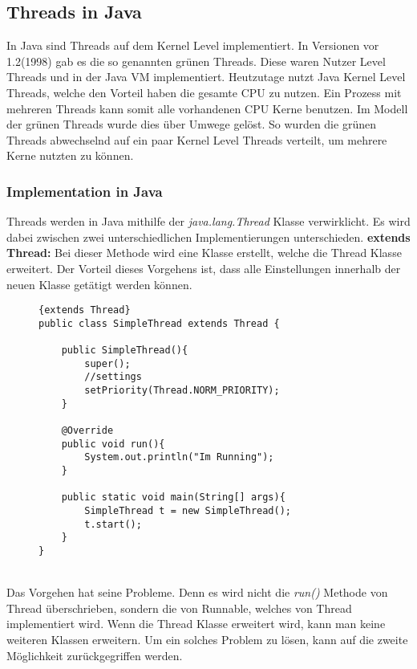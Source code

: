 \subsection{Threads in Java}
In Java sind Threads auf dem Kernel Level implementiert. In Versionen vor 1.2(1998) gab es die so genannten grünen Threads. Diese waren Nutzer Level Threads und in der Java VM implementiert. Heutzutage nutzt Java Kernel Level Threads, welche den Vorteil haben die gesamte CPU zu nutzen. Ein Prozess mit mehreren Threads kann somit alle vorhandenen CPU Kerne benutzen. Im Modell der grünen Threads wurde dies über Umwege gelöst. So wurden die grünen Threads abwechselnd auf ein paar Kernel Level Threads verteilt, um mehrere Kerne nutzten zu können.\cite{Threads:Cox}
\subsubsection{Implementation in Java}
Threads werden in Java mithilfe der \textit{java.lang.Thread} Klasse verwirklicht. Es wird dabei zwischen zwei unterschiedlichen Implementierungen unterschieden.
\smallskip
\newline
\textbf{extends Thread:} Bei dieser Methode wird eine Klasse erstellt, welche die Thread Klasse erweitert. Der Vorteil dieses Vorgehens ist, dass alle Einstellungen innerhalb der neuen Klasse getätigt werden können.\cite{Java:Thread}
\begin{figure}[h]
\begin{lstlisting}{extends Thread}
public class SimpleThread extends Thread {

    public SimpleThread(){
        super();
        //settings
        setPriority(Thread.NORM_PRIORITY);
    }

    @Override
    public void run(){
        System.out.println("Im Running");
    }

    public static void main(String[] args){
        SimpleThread t = new SimpleThread();
        t.start();
    }
}
\end{lstlisting}
\end{figure}
\\Das Vorgehen hat seine Probleme. Denn es wird nicht die \textit{run()} Methode von Thread überschrieben, sondern die von Runnable, welches von Thread implementiert wird. Wenn die Thread Klasse erweitert wird, kann man keine weiteren Klassen erweitern. Um ein solches Problem zu lösen, kann auf die zweite Möglichkeit zurückgegriffen werden.
